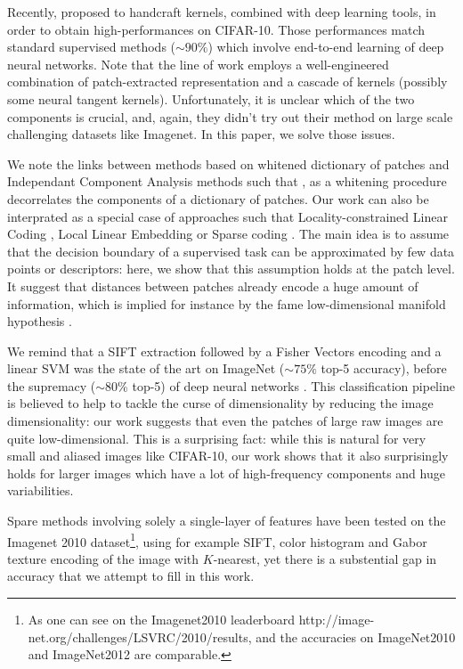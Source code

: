 \documentclass{article}
\begin{document}
Recently, \citep{li2019enhanced,shankar2020neural} proposed to handcraft kernels, combined with deep learning tools, in order to obtain high-performances on CIFAR-10.
Those performances  match standard supervised methods ($\sim 90\%$) which involve end-to-end learning of deep neural networks.
Note that the line of work \citep{li2019enhanced,shankar2020neural,mairal2016end} employs a well-engineered combination of patch-extracted representation and a cascade of kernels (possibly some neural tangent kernels).
Unfortunately, it is unclear which of the two components is crucial, and, again, they didn't try out their method on large scale challenging datasets like Imagenet.
In this paper, we solve those issues.

{We  note the links between methods based on whitened dictionary of patches and Independant Component Analysis methods such that \citep{ngiam2010tiled}, as a whitening procedure decorrelates the components of a dictionary of patches. Our work can also be interprated as a special case of approaches such that Locality-constrained Linear Coding \citep{russakovsky2015imagenet,yu2010improved}, Local Linear Embedding \citep{Roweis2323} or Sparse coding \citep{bo2013multipath}. The main idea is to assume that the  decision boundary of a supervised task can be approximated by few data points or descriptors: here, we show that this assumption holds at the patch level. It suggest that distances between patches already encode a huge amount of information, which is implied for instance by the fame low-dimensional manifold hypothesis 
\citep{fefferman2016testing}. 

We remind that a SIFT extraction \cite{lowe2004distinctive} followed by a Fisher Vectors  encoding \citep{sanchez2013image} and a linear SVM was the state of the art on ImageNet ($\sim 75\% $ top-5 accuracy), before the supremacy ($\sim 80$\% top-5) of deep neural networks \citet{krizhevsky2012imagenet}. This classification pipeline is believed to help to tackle the curse of dimensionality by reducing the image dimensionality: our work  suggests that even the patches of large raw images are quite low-dimensional. This is a surprising fact: while this is natural for very small and aliased  images like CIFAR-10, our work shows that it also surprisingly holds for larger images which have a lot of high-frequency components and huge variabilities.

Spare methods involving solely a single-layer of  features  have been tested on the Imagenet 2010 dataset\footnote{ As one can see on the Imagenet2010 leaderboard http://image-net.org/challenges/LSVRC/2010/results, and the accuracies on ImageNet2010 and ImageNet2012 are comparable.}, using for example SIFT, color histogram and Gabor texture encoding of the image with $K$-nearest, yet there is a substential gap in accuracy that we attempt to fill in this work.

}
\end{document}
